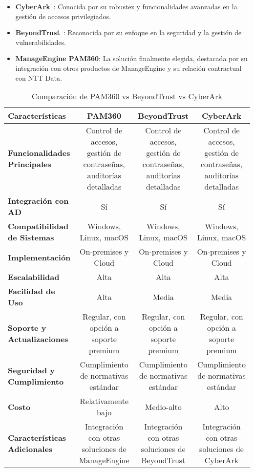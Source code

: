 \begin{itemize}
	\item \textbf{CyberArk}~\cite{cyberark}: Conocida por su robustez y funcionalidades avanzadas en la gestión de accesos privilegiados.
	\item \textbf{BeyondTrust}~\cite{beyondtrust}: Reconocida por su enfoque en la seguridad y la gestión de vulnerabilidades.
	\item \textbf{ManageEngine PAM360}: La solución finalmente elegida, destacada por su integración con otros productos de ManageEngine y su relación contractual con NTT Data.
\end{itemize}
	\label{PAM analizados}
\begin{table}[H]
	\centering
	\begin{adjustbox}{max width=\textwidth}
		\begin{tabular}{|l|c|c|c|}
			\hline
			\textbf{Características}                & \textbf{PAM360} & \textbf{BeyondTrust} & \textbf{CyberArk} \\ \hline
			\textbf{Funcionalidades Principales}    & Control de accesos, gestión de contraseñas, auditorías detalladas & Control de accesos, gestión de contraseñas, auditorías detalladas & Control de accesos, gestión de contraseñas, auditorías detalladas \\ \hline
			\textbf{Integración con AD}             & Sí & Sí & Sí \\ \hline
			\textbf{Compatibilidad de Sistemas}     & Windows, Linux, macOS & Windows, Linux, macOS & Windows, Linux, macOS \\ \hline
			\textbf{Implementación}                 & On-premises y Cloud & On-premises y Cloud & On-premises y Cloud \\ \hline
			\textbf{Escalabilidad}                  & Alta & Alta & Alta \\ \hline
			\textbf{Facilidad de Uso}               & Alta & Media & Media \\ \hline
			\textbf{Soporte y Actualizaciones}      & Regular, con opción a soporte premium & Regular, con opción a soporte premium & Regular, con opción a soporte premium \\ \hline
			\textbf{Seguridad y Cumplimiento}       & Cumplimiento de normativas estándar & Cumplimiento de normativas estándar & Cumplimiento de normativas estándar \\ \hline
			\textbf{Costo}                          & Relativamente bajo & Medio-alto & Alto \\ \hline
			\textbf{Características Adicionales}    & Integración con otras soluciones de ManageEngine & Integración con otras soluciones de BeyondTrust & Integración con otras soluciones de CyberArk \\ \hline
		\end{tabular}
	\end{adjustbox}
	\caption{Comparación de PAM360 vs BeyondTrust vs CyberArk}
	\label{tab:comparison}
\end{table}
	
